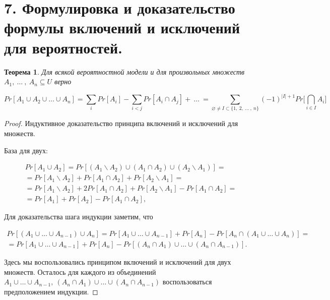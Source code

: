 \documentclass[a4paper, 12pt]{article}
\newtheorem*{theorem}{Теорема}
\begin{document}
\section*{7. Формулировка и доказательство формулы включений и исключений для вероятностей.}

\begin{theorem}

Для всякой вероятностной модели и для произвольных множеств $A_1,\ \ldots\ ,\ A_n \subseteq U$ верно

\[
    Pr[A_1\cup A_2\cup \ldots \cup A_n] = \sum\limits_{i}Pr[A_i] - \sum\limits_{i < j}Pr[A_i \cap A_j] + \ \ldots \ = \sum\limits_{\varnothing \neq I \subset \{1,\ 2,\ \ldots \ , \ n\}} (-1)^{|I| + 1} Pr \Biggl[\bigcap_{i \in I}A_i\Biggl]
\]

\end{theorem}

\begin{proof}

Индуктивное доказательство принципа включений
и исключений для множеств.

База для двух:

\begin{multline*}
    Pr[A_1 \cup A_2] = Pr [(A_1 \backslash A_2) \cup (A_1 \cap A_2) \cup (A_2 \backslash A_1)] = \\ = Pr[A_1 \backslash A_2] + Pr[A_1 \cap A_2] + Pr[A_2 \backslash A_1] = \\ = Pr[A_1 \backslash A_2] + 2 Pr[A_1 \cap A_2] + Pr[A_2 \backslash A_1] - Pr[A_1 \cap A_2] = \\ = Pr[A_1] + Pr[A_2] - Pr[A_1 \cap A_2],
\end{multline*}

Для доказательства шага индукции заметим, что

\begin{multline*}
    Pr [(A_1 \cup \ldots \cup A_{n - 1}) \cup A_n] = Pr [A_1 \cup \ldots \cup A_{n - 1}] + Pr[A_n] - Pr [A_n \cap (A_1 \cup \ldots \cup A_n)] = \\ = Pr [A_1 \cup \ldots \cup A_{n - 1}] + Pr[A_n] - Pr [(A_n \cap A_1) \cup \ldots \cup (A_n \cap A_{n - 1})].
\end{multline*}

Здесь мы воспользовались принципом включений и исключений для двух множеств. Осталось для каждого из объединений $A_1 \cup \ldots \cup A_{n - 1},\ (A_n \cap A_1) \cup \ldots \cup (A_n \cap A_{n - 1})$ воспользоваться предположением индукции.

\end{proof}
\end{document}
